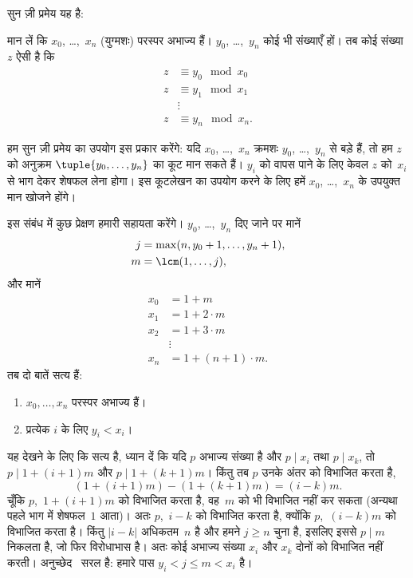 \documentclass[../../../include/open-logic-section]{subfiles}
\begin{document}
सुन ज़ी प्रमेय यह है:
\begin{thm}
मान लें कि $x_0$, \dots,~$x_n$ (युग्मशः) परस्पर अभाज्य हैं।
$y_0$, \dots,~$y_n$ कोई भी संख्याएँ हों। तब कोई संख्या $z$ ऐसी है कि
\begin{align*}
z & \equiv y_0 \mod x_0 \\
z & \equiv y_1 \mod x_1 \\
& \vdots  \\
z & \equiv y_n \mod x_n.
\end{align*}
\end{thm}

हम सुन ज़ी प्रमेय का उपयोग इस प्रकार करेंगे: यदि $x_0$, \dots,~$x_n$
क्रमशः $y_0$, \dots,~$y_n$ से बड़े हैं, तो हम $z$ को अनुक्रम
$\tuple{y_0, \dots,y_n}$ का कूट मान सकते हैं। $y_i$ को वापस पाने के लिए
केवल $z$ को~$x_i$ से भाग देकर शेषफल लेना होगा। इस कूटलेखन का उपयोग करने
के लिए हमें $x_0$, \dots,~$x_n$ के उपयुक्त मान खोजने होंगे।

इस संबंध में कुछ प्रेक्षण हमारी सहायता करेंगे। $y_0$, \dots,~$y_n$ दिए
जाने पर मानें
\begin{align*}
j &= \max(n, y_0 + 1, \dots, y_n + 1), \\
m &= \lcm(1,\dots,j),
\end{align*}
और मानें
\begin{align*}
x_0 & = 1 + m \\
x_1 & = 1 + 2 \cdot m \\
x_2 & = 1 + 3 \cdot m \\
& \vdots  \\
x_n & = 1 + (n+1) \cdot m.
\end{align*}
तब दो बातें सत्य हैं:
\begin{enumerate}
\item{} $x_0,\dots,x_n$ परस्पर अभाज्य हैं।
\item{} प्रत्येक $i$ के लिए $y_i < x_i$।
\end{enumerate}
यह देखने के लिए कि  सत्य है, ध्यान दें कि यदि $p$ अभाज्य
संख्या है और $p \mid x_i$ तथा $p \mid x_k$, तो
$p \mid 1 + (i+1) m$ और $p \mid 1 + (k+1) m$। किंतु तब $p$ उनके अंतर को
विभाजित करता है,
\[
(1 + (i+1)m) - (1+ (k+1)m) = (i-k) m.
\]
चूँकि $p$,~$1 + (i+1)m$ को विभाजित करता है, वह~$m$ को भी विभाजित नहीं कर
सकता (अन्यथा पहले भाग में शेषफल~$1$ आता)। अतः $p$,~$i-k$ को विभाजित करता
है, क्योंकि $p$,~$(i-k)m$ को विभाजित करता है। किंतु
$\left|i-k\right|$ अधिकतम~$n$ है और हमने $j \geq n$ चुना है, इसलिए इससे
$p \mid m$ निकलता है, जो फिर विरोधाभास है। अतः कोई अभाज्य संख्या $x_i$
और $x_k$ दोनों को विभाजित नहीं करती। अनुच्छेद~ सरल है: हमारे
पास $y_i < j \leq m < x_i$ है।
\end{document}
